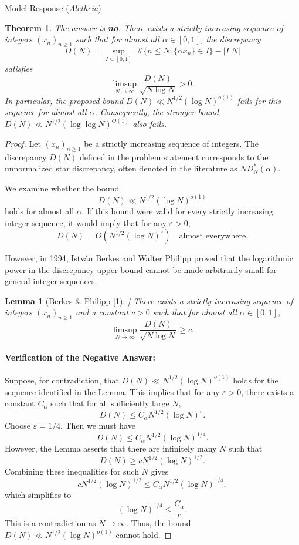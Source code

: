 \documentclass[11pt]{article}
\newtheorem{theorem}{Theorem}
\newtheorem{lemma}{Lemma}
\begin{document}
\begin{solution}{Model Response (\emph{Aletheia})}
\begin{theorem}
The answer is \textbf{no}. There exists a strictly increasing sequence of integers $(x_n)_{n \ge 1}$ such that for almost all $\alpha \in [0,1]$, the discrepancy
\[ D(N) = \sup_{I\subseteq [0,1]} \lvert \#\{ n\leq N : \{ \alpha x_n\}\in I\} - \lvert I\rvert N\rvert \]
satisfies
\[ \limsup_{N \to \infty} \frac{D(N)}{\sqrt{N \log N}} > 0. \]
In particular, the proposed bound $D(N) \ll N^{1/2}(\log N)^{o(1)}$ fails for this sequence for almost all $\alpha$. Consequently, the stronger bound $D(N) \ll N^{1/2}(\log\log N)^{O(1)}$ also fails.
\end{theorem}

\begin{proof}
Let $(x_n)_{n \ge 1}$ be a strictly increasing sequence of integers. The discrepancy $D(N)$ defined in the problem statement corresponds to the unnormalized star discrepancy, often denoted in the literature as $N D_N^*(\alpha)$.

We examine whether the bound
\[ D(N) \ll N^{1/2}(\log N)^{o(1)} \]
holds for almost all $\alpha$. If this bound were valid for every strictly increasing integer sequence, it would imply that for any $\varepsilon > 0$,
\[ D(N) = O(N^{1/2}(\log N)^\varepsilon) \quad \text{almost everywhere}. \]

However, in 1994, Istv\'{a}n Berkes and Walter Philipp proved that the logarithmic power in the discrepancy upper bound cannot be made arbitrarily small for general integer sequences.

\begin{lemma}[Berkes \& Philipp [1]]
There exists a strictly increasing sequence of integers $(x_n)_{n \ge 1}$ and a constant $c > 0$ such that for almost all $\alpha \in [0,1]$,
\[ \limsup_{N \to \infty} \frac{D(N)}{\sqrt{N \log N}} \geq c. \]
\end{lemma}

\paragraph{Verification of the Negative Answer:}
Suppose, for contradiction, that $D(N) \ll N^{1/2}(\log N)^{o(1)}$ holds for the sequence identified in the Lemma. This implies that for any $\varepsilon > 0$, there exists a constant $C_\alpha$ such that for all sufficiently large $N$,
\[ D(N) \leq C_\alpha N^{1/2}(\log N)^\varepsilon. \]
Choose $\varepsilon = 1/4$. Then we must have
\[ D(N) \leq C_\alpha N^{1/2}(\log N)^{1/4}. \]
However, the Lemma asserts that there are infinitely many $N$ such that
\[ D(N) \geq c N^{1/2}(\log N)^{1/2}. \]
Combining these inequalities for such $N$ gives
\[ c N^{1/2}(\log N)^{1/2} \leq C_\alpha N^{1/2}(\log N)^{1/4}, \]
which simplifies to
\[ (\log N)^{1/4} \leq \frac{C_\alpha}{c}. \]
This is a contradiction as $N \to \infty$. Thus, the bound $D(N) \ll N^{1/2}(\log N)^{o(1)}$ cannot hold.


\end{proof}
\end{solution}
\end{document}

